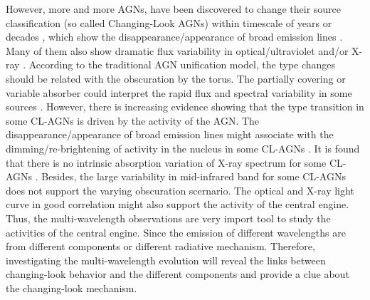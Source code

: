 \documentclass[twocolumn]{aastex63}
\begin{document}
{However, more and more AGNs, have been discovered to change their source classification (so called Changing-Look AGNs) within timescale of years or decades \citep[e.g.][]{2016MNRAS.457..389M, 2016ApJ...826..188R, 2018ApJ...864...27S, 2019ApJ...874....8M,2020MNRAS.491.4925G}, 
which show the disappearance/appearance of broad emission lines \citep[e.g.][]{2016MNRAS.457..389M,2019MNRAS.486..123R}. Many of them also show dramatic flux variability in optical/ultraviolet and/or X-ray \citep[e.g.][]{2017ApJ...846L...7S,2019MNRAS.483L..88P}. According to the traditional AGN unification model, the type changes should be related with the obscuration by the torus. The partially covering or variable absorber could interpret the rapid flux and spectral variability in some sources \citep[e.g.][]{2013MNRAS.436.1615M,2014MNRAS.443.2862A,2015ApJ...815...55R,2018MNRAS.481.2470T}. However, there is increasing evidence showing that the type transition in some CL-AGNs is driven by the activity of the AGN. The disappearance/appearance of broad emission lines might  associate with the dimming/re-brightening of activity in the nucleus in some CL-AGNs \citep[e.g.][]{2014ApJ...796..134D}. It is found that there is no intrinsic absorption variation of X-ray spectrum for some CL-AGNs \citep[e.g.][]{2016A&A...593L...9H}. Besides, the large variability in mid-infrared band for some CL-AGNs \citep[e.g.][]{2017ApJ...846L...7S} does not support the varying obscuration scernario. The optical and X-ray light curve in good correlation might also support the activity of the central engine. Thus, the multi-wavelength observations are very import tool to study the activities of the central engine. Since the emission of different wavelengths are from different components or different radiative mechanism. %
Therefore, investigating the multi-wavelength evolution will reveal the links between changing-look behavior and the different components and provide a clue about the changing-look mechanism.}


\end{document}
